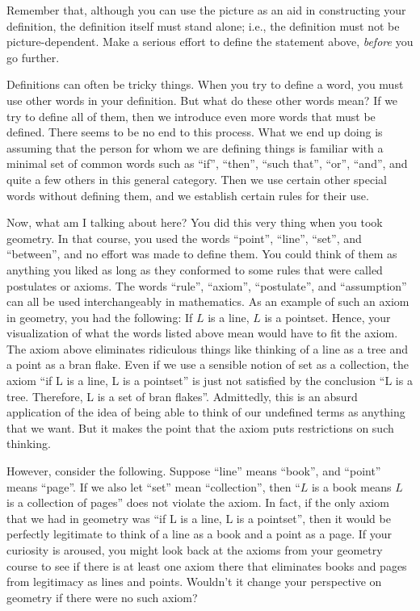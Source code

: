 \documentclass[english]{book}
\begin{document}
Remember that, although you can use the picture as an aid in constructing your definition, the definition itself must stand alone; i.e., the definition must not be picture-dependent. Make a serious effort to define the statement above, \emph{before} you go further.

Definitions can often be tricky things. When you try to define a word, you must use other words in your definition. But what do these other words mean? If we try to define all of them, then we introduce even more words that must be defined. There seems to be no end to this process. What we end up doing is assuming that the person for whom we are defining things is familiar with a minimal set of common words such as ``if'', ``then'', ``such that'', ``or'', ``and'', and quite a few others in this general category. Then we use certain other special words without defining them, and we establish certain rules for their use.

Now, what am I talking about here? You did this very thing when you took geometry. In that course, you used the words ``point'', ``line'', ``set'', and ``between'', and no effort was made to define them. You could think of them as anything you liked as long as they conformed to some rules that were called postulates or axioms. The words ``rule'', ``axiom'', ``postulate'', and ``assumption'' can all be used interchangeably in mathematics. As an example of such an axiom in geometry, you had the following: If $L$ is a line, $L$ is a pointset. Hence, your visualization of what the words listed above mean would have to fit the axiom. The axiom above eliminates ridiculous things like thinking of a line as a tree and a point as a bran flake. Even if we use a sensible notion of set as a collection, the axiom ``if L is a line, L is a pointset'' is just not satisfied by the conclusion ``L is a tree. Therefore, L is a set of bran flakes''.  Admittedly, this is an absurd application of the idea of being able to think of our undefined terms as anything that we want. But it makes the point that the axiom puts restrictions on such thinking. 

However, consider the following. Suppose ``line'' means ``book'', and ``point'' means ``page''. If we also let ``set'' mean ``collection'', then ``$L$ is a book means $L$ is a collection of pages'' does not violate the axiom. In fact, if the only axiom that we had in geometry was ``if L is a line, L is a pointset'', then it would be perfectly legitimate to think of a line as a book and a point as a page. If your curiosity is aroused, you might look back at the axioms from your geometry course to see if there is at least one axiom there that eliminates books and pages from legitimacy as lines and points. Wouldn't it change your perspective on geometry if there were no such axiom? 
\end{document}
